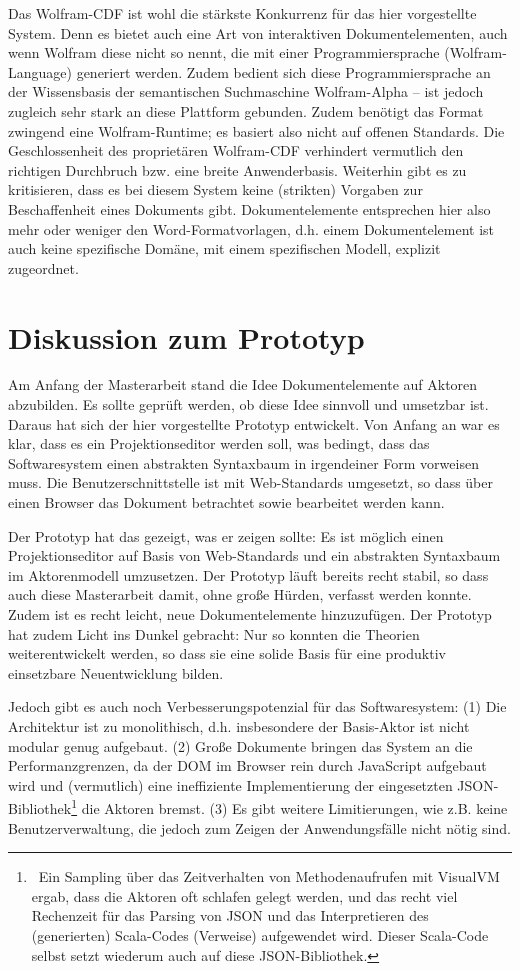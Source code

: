  
Das Wolfram-CDF ist wohl die stärkste Konkurrenz für das hier vorgestellte System. Denn es bietet auch eine Art von interaktiven Dokumentelementen, auch wenn Wolfram diese nicht so nennt, die mit einer Programmiersprache (Wolfram-Language) generiert werden. Zudem bedient sich diese Programmiersprache an der Wissensbasis der semantischen Suchmaschine Wolfram-Alpha -- ist jedoch zugleich sehr stark an diese Plattform gebunden. Zudem benötigt das Format zwingend eine Wolfram-Runtime; es basiert also nicht auf offenen Standards. Die Geschlossenheit des proprietären Wolfram-CDF verhindert vermutlich den richtigen Durchbruch bzw. eine breite Anwenderbasis. Weiterhin gibt es zu kritisieren, dass es bei diesem System keine (strikten) Vorgaben zur Beschaffenheit eines Dokuments gibt. Dokumentelemente entsprechen hier also mehr oder weniger den Word-Formatvorlagen, d.h. einem Dokumentelement ist auch keine spezifische Domäne, mit einem spezifischen Modell, explizit zugeordnet.

 
\section{Diskussion zum Prototyp}\label{}
 
Am Anfang der Masterarbeit stand die Idee Dokumentelemente auf Aktoren abzubilden. Es sollte geprüft werden, ob diese Idee sinnvoll und umsetzbar ist. Daraus hat sich der hier vorgestellte Prototyp entwickelt. Von Anfang an war es klar, dass es ein Projektionseditor werden soll, was bedingt, dass das Softwaresystem einen abstrakten Syntaxbaum in irgendeiner Form vorweisen muss. Die Benutzerschnittstelle ist mit Web-Standards umgesetzt, so dass über einen Browser das Dokument betrachtet sowie bearbeitet werden kann.

 
Der Prototyp hat das gezeigt, was er zeigen sollte: Es ist möglich einen Projektionseditor auf Basis von Web-Standards und ein abstrakten Syntaxbaum im Aktorenmodell umzusetzen. Der Prototyp läuft bereits recht stabil, so dass auch diese Masterarbeit damit, ohne große Hürden, verfasst werden konnte. Zudem ist es recht leicht, neue Dokumentelemente hinzuzufügen. Der Prototyp hat zudem Licht ins Dunkel gebracht: Nur so konnten die Theorien weiterentwickelt werden, so dass sie eine solide Basis für eine produktiv einsetzbare Neuentwicklung bilden.

 
Jedoch gibt es auch noch Verbesserungspotenzial für das Softwaresystem: (1) Die Architektur ist zu monolithisch, d.h. insbesondere der Basis-Aktor ist nicht modular genug aufgebaut. (2) Große Dokumente bringen das System an die Performanzgrenzen, da der DOM im Browser rein durch JavaScript aufgebaut wird und (vermutlich) eine ineffiziente Implementierung der eingesetzten JSON-Bibliothek\footnote{~Ein Sampling über das Zeitverhalten von Methodenaufrufen mit VisualVM ergab, dass die Aktoren oft schlafen gelegt werden, und das recht viel Rechenzeit für das Parsing von JSON und das Interpretieren des (generierten) Scala-Codes (Verweise) aufgewendet wird. Dieser Scala-Code selbst setzt wiederum auch auf diese JSON-Bibliothek.} die Aktoren bremst. (3) Es gibt weitere Limitierungen, wie z.B. keine Benutzerverwaltung, die jedoch zum Zeigen der Anwendungsfälle nicht nötig sind.

